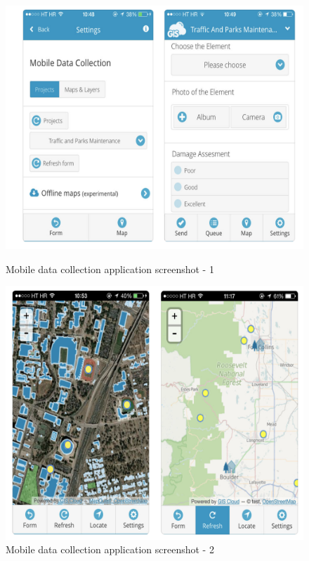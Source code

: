 \begin{itemize}
  \begin{figure}[!htb]
        \begin{minipage}{0.35\textwidth}
            \centering
            \includegraphics[width=1.0\linewidth]{figures/ch1/mobile_data_collection_1.png}
            \caption{Mobile data collection application screenshot - 1}\label{Fig:mobile_data_collection_1}
        \end{minipage}\hfill
        \begin{minipage}{0.35\textwidth}
            \centering
            \includegraphics[width=1.0\linewidth]{figures/ch1/mobile_data_collection_2.png}
            \caption{Mobile data collection application screenshot - 2}\label{Fig:mobile_data_collection_2}
        \end{minipage}
\end{figure}


\end{itemize}
